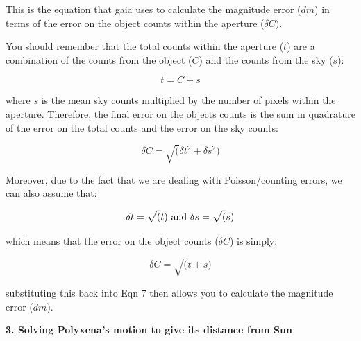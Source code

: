 \documentclass[12pt]{article}
\begin{document}
\noindent
This is the equation that {\sc gaia} uses to calculate the magnitude
error ($dm$) in terms of the error on the object counts within the
aperture ($\delta C)$.

You should remember that the total counts within the aperture ($t$)
are a combination of the counts from the object ($C$) and the counts from the
sky ($s$):

\begin{equation}
t= C + s 
\end{equation}

where $s$ is the mean sky counts multiplied by the number of pixels
within the aperture. Therefore, the final error on the objects counts
is the sum in quadrature of the error on the total counts and the
error on the sky counts:

\begin{equation}
\delta C = \sqrt( \delta t^2 + \delta s^2 )
\end{equation}

Moreover, due to the fact that we are dealing with Poisson/counting
errors, we can also assume that:

\begin{equation}
\delta t = \sqrt(t)\,\, {\rm and}\,\, \delta s = \sqrt(s)
\end{equation}

which means that the error on the object counts ($\delta C$) is
simply:

\begin{equation}
\delta C = \sqrt(t+s)
\end{equation}

substituting this back into Eqn 7 then allows you to calculate the
magnitude error ($dm$).


\newpage
\begin{center}
{\large{\bf 3. Solving Polyxena's motion to give its distance from Sun}}
\end{center}
\centerline{}
\end{document}
